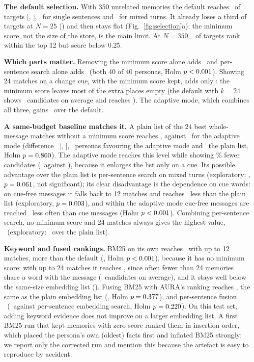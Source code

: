 \IfFileExists{IEEEtran.cls}{\documentclass[journal]{IEEEtran}\def\HAVEIEEE{1}}{\documentclass[10pt,twocolumn]{article}\usepackage[margin=0.7in,columnsep=0.25in]{geometry}}
\newcommand{\aura}{AURA}
\begin{document}
\textbf{The default selection.} With 350 unrelated memories the default reaches \selDefault\ of targets [\selDefaultLo, \selDefaultHi], \selDefaultSingle\ for single sentences and \selDefaultMixed\ for mixed turns. It already loses a third of targets at $N=25$ (\selDefaultTwentyfive) and then stays flat (Fig.~\ref{fig:selection}a): the minimum score, not the size of the store, is the main limit. At $N=350$, \selLostFloor\ of targets rank within the top 12 but score below 0.25.

\textbf{Which parts matter.} Removing the minimum score alone adds \selCNominVsDef\ and per-sentence search alone adds \selCSentVsDef\ (both 40 of 40 personas, Holm $p<0.001$). Showing 24 matches on a change cue, with the minimum score kept, adds only \selCCueVsDef: the minimum score leaves most of the extra places empty (the default with $k=24$ shows \selDefaultKkCand\ candidates on average and reaches \selDefaultKk). The adaptive mode, which combines all three, gains \selCAdaVsDef\ over the default.

\textbf{A same-budget baseline matches it.} A plain list of the 24 best whole-message matches without a minimum score reaches \selNominKk, against \selAdaptive\ for the adaptive mode (difference \selCAdaVsNk\ [\selCAdaVsNkLo, \selCAdaVsNkHi], \selCAdaVsNkPos\ personas favouring the adaptive mode and \selCAdaVsNkNeg\ the plain list, Holm $p=0.860$). The adaptive mode reaches this level while showing \selCandSaving\% fewer candidates (\selAdaptiveCand\ against \selNominKkCand), because it enlarges the list only on a cue. Its possible advantage over the plain list is per-sentence search on mixed turns (exploratory: \selEMixAdaVsNk, $p=0.061$, not significant); its clear disadvantage is the dependence on cue words: on cue-free messages it falls back to 12 matches and reaches \selEFreeAdaVsNk\ less than the plain list (exploratory, $p=0.003$), and within the adaptive mode cue-free messages are reached \selCAdaFreeVsCue\ less often than cue messages (Holm $p<0.001$). Combining per-sentence search, no minimum score and 24 matches always gives the highest value, \selSentNominKk\ (exploratory: \selESnkVsNk\ over the plain list).

\textbf{Keyword and fused rankings.} BM25 on its own reaches \selBmTwelve\ with up to 12 matches, more than the default (\selBBmVsDef, Holm $p<0.001$), because it has no minimum score; with up to 24 matches it reaches \selBmTwentyfour, since often fewer than 24 memories share a word with the message (\selBmTwentyfourCand\ candidates on average), and it stays well below the same-size embedding list (\selBBmVsNk). Fusing BM25 with \aura's ranking reaches \selRrf, the same as the plain embedding list (\selBRrfVsNk, Holm $p=0.377$), and per-sentence fusion \selSentRrf\ (\selBSentRrfVsSnk\ against per-sentence embedding search, Holm $p=0.220$). On this test set, adding keyword evidence does not improve on a larger embedding list. A first BM25 run that kept memories with zero score ranked them in insertion order, which placed the persona's own (oldest) facts first and inflated BM25 strongly; we report only the corrected run and mention this because the artefact is easy to reproduce by accident.
\end{document}
